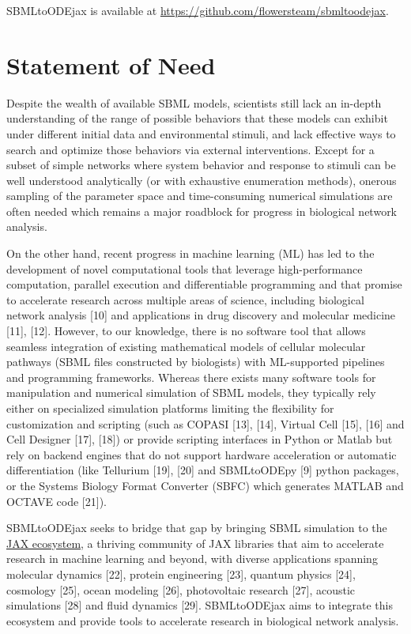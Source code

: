 \documentclass[
]{article}
\begin{document}
SBMLtoODEjax is available at
\url{https://github.com/flowersteam/sbmltoodejax}.

\hypertarget{statement-of-need}{%
\section{Statement of Need}\label{statement-of-need}}

Despite the wealth of available SBML models, scientists still lack an
in-depth understanding of the range of possible behaviors that these
models can exhibit under different initial data and environmental
stimuli, and lack effective ways to search and optimize those behaviors
via external interventions. Except for a subset of simple networks where
system behavior and response to stimuli can be well understood
analytically (or with exhaustive enumeration methods), onerous sampling
of the parameter space and time-consuming numerical simulations are
often needed which remains a major roadblock for progress in biological
network analysis.

On the other hand, recent progress in machine learning (ML) has led to
the development of novel computational tools that leverage
high-performance computation, parallel execution and differentiable
programming and that promise to accelerate research across multiple
areas of science, including biological network analysis {[}10{]} and
applications in drug discovery and molecular medicine {[}11{]},
{[}12{]}. However, to our knowledge, there is no software tool that
allows seamless integration of existing mathematical models of cellular
molecular pathways (SBML files constructed by biologists) with
ML-supported pipelines and programming frameworks. Whereas there exists
many software tools for manipulation and numerical simulation of SBML
models, they typically rely either on specialized simulation platforms
limiting the flexibility for customization and scripting (such as COPASI
{[}13{]}, {[}14{]}, Virtual Cell {[}15{]}, {[}16{]} and Cell Designer
{[}17{]}, {[}18{]}) or provide scripting interfaces in Python or Matlab
but rely on backend engines that do not support hardware acceleration or
automatic differentiation (like Tellurium {[}19{]}, {[}20{]} and
SBMLtoODEpy {[}9{]} python packages, or the Systems Biology Format
Converter (SBFC) which generates MATLAB and OCTAVE code {[}21{]}).

SBMLtoODEjax seeks to bridge that gap by bringing SBML simulation to the
\href{https://github.com/n2cholas/awesome-jax}{JAX ecosystem}, a
thriving community of JAX libraries that aim to accelerate research in
machine learning and beyond, with diverse applications spanning
molecular dynamics {[}22{]}, protein engineering {[}23{]}, quantum
physics {[}24{]}, cosmology {[}25{]}, ocean modeling {[}26{]},
photovoltaic research {[}27{]}, acoustic simulations {[}28{]} and fluid
dynamics {[}29{]}. SBMLtoODEjax aims to integrate this ecosystem and
provide tools to accelerate research in biological network analysis.
\end{document}
